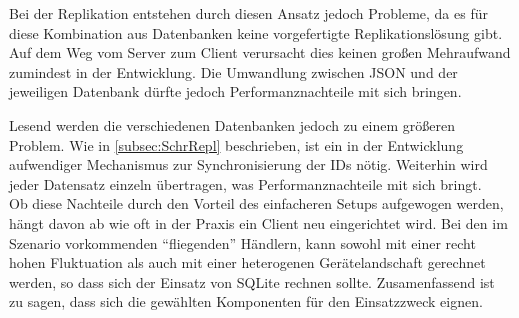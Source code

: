 \documentclass[12pt,a4paper,ngerman,english]{report}
\begin{document}
Bei der Replikation entstehen durch diesen Ansatz jedoch Probleme, da es für diese Kombination aus Datenbanken keine vorgefertigte Replikationslösung gibt. Auf dem Weg vom Server zum Client verursacht dies keinen großen Mehraufwand zumindest in der Entwicklung. Die Umwandlung zwischen JSON und der jeweiligen Datenbank dürfte jedoch Performanznachteile mit sich bringen.

Lesend werden die verschiedenen Datenbanken jedoch zu einem größeren Problem. Wie in \autoref{subsec:SchrRepl} beschrieben, ist ein in der Entwicklung aufwendiger Mechanismus zur Synchronisierung der IDs nötig. Weiterhin wird jeder Datensatz einzeln übertragen, was Performanznachteile mit sich bringt.\\

Ob diese Nachteile durch den Vorteil des einfacheren Setups aufgewogen werden, hängt davon ab wie oft in der Praxis ein Client neu eingerichtet wird. Bei den im Szenario vorkommenden ``fliegenden'' Händlern, kann sowohl mit einer recht hohen Fluktuation als auch mit einer heterogenen Gerätelandschaft gerechnet werden, so dass sich der Einsatz von SQLite rechnen sollte. Zusamenfassend ist zu sagen, dass sich die gewählten Komponenten für den Einsatzzweck eignen.
\end{document}
